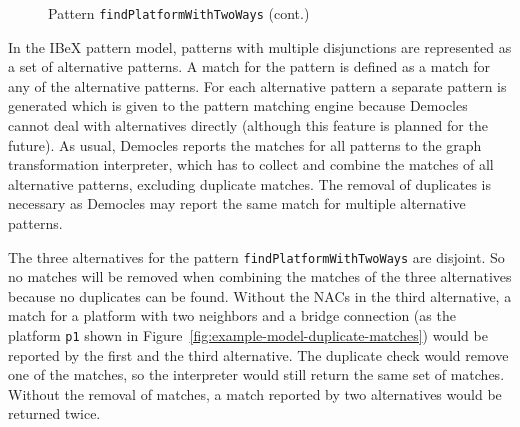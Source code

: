 \begin{figure}
	\ContinuedFloat
	\centering
	\caption[]{Pattern \texttt{findPlatformWithTwoWays} (cont.)}
\end{figure}

\noindent
In the IBeX pattern model, patterns with multiple disjunctions are represented as a set of alternative patterns.
A match for the pattern is defined as a match for any of the alternative patterns.
For each alternative pattern a separate pattern is generated which is given to the pattern matching engine because Democles cannot deal with alternatives directly (although this feature is planned for the future).
As usual, Democles reports the matches for all patterns to the graph transformation interpreter, which has to collect and combine the matches of all alternative patterns, excluding duplicate matches.
The removal of duplicates is necessary as Democles may report the same match for multiple alternative patterns.

The three alternatives for the pattern \texttt{findPlatformWithTwoWays} are disjoint.
So no matches will be removed when combining the matches of the three alternatives because no duplicates can be found.
Without the NACs in the third alternative, a match for a platform with two neighbors and a bridge connection (as the platform \texttt{p1} shown in Figure~\ref{fig:example-model-duplicate-matches}) would be reported by the first and the third alternative.
The duplicate check would remove one of the matches, so the interpreter would still return the same set of matches.
Without the removal of matches, a match reported by two alternatives would be returned twice.

